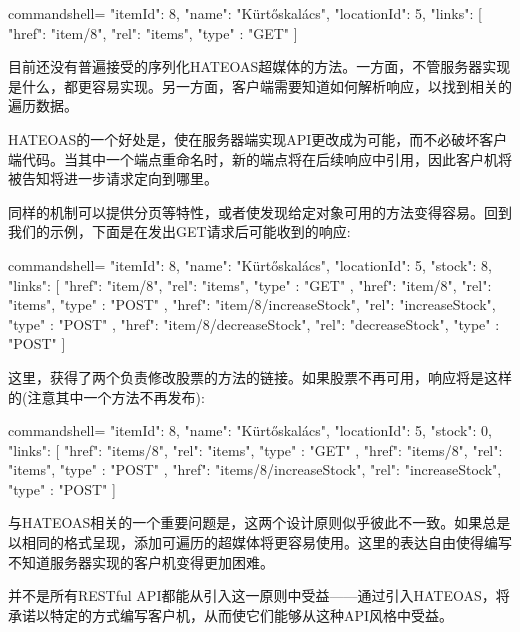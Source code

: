 \begin{tcblisting}{commandshell={}}
{
  "itemId": 8,
  "name": "Kürtőskalács",
  "locationId": 5,
  "links": [
    {
      "href": "item/8",
      "rel": "items",
      "type" : "GET"
    }
  ]
}
\end{tcblisting}

目前还没有普遍接受的序列化HATEOAS超媒体的方法。一方面，不管服务器实现是什么，都更容易实现。另一方面，客户端需要知道如何解析响应，以找到相关的遍历数据。

HATEOAS的一个好处是，使在服务器端实现API更改成为可能，而不必破坏客户端代码。当其中一个端点重命名时，新的端点将在后续响应中引用，因此客户机将被告知将进一步请求定向到哪里。

同样的机制可以提供分页等特性，或者使发现给定对象可用的方法变得容易。回到我们的示例，下面是在发出GET请求后可能收到的响应:

\begin{tcblisting}{commandshell={}}
{
  "itemId": 8,
  "name": "Kürtőskalács",
  "locationId": 5,
  "stock": 8,
  "links": [
    {
      "href": "item/8",
      "rel": "items",
      "type" : "GET"
    },
    {
      "href": "item/8",
      "rel": "items",
      "type" : "POST"
    },
    {
      "href": "item/8/increaseStock",
      "rel": "increaseStock",
      "type" : "POST"
    },
    {
      "href": "item/8/decreaseStock",
      "rel": "decreaseStock",
      "type" : "POST"
    }
  ]
}
\end{tcblisting}

这里，获得了两个负责修改股票的方法的链接。如果股票不再可用，响应将是这样的(注意其中一个方法不再发布):

\begin{tcblisting}{commandshell={}}
{
  "itemId": 8,
  "name": "Kürtőskalács",
  "locationId": 5,
  "stock": 0,
  "links": [
    {
      "href": "items/8",
      "rel": "items",
      "type" : "GET"
    },
    {
      "href": "items/8",
      "rel": "items",
      "type" : "POST"
    },
    {
      "href": "items/8/increaseStock",
      "rel": "increaseStock",
      "type" : "POST"
    }
  ]
}
\end{tcblisting}

与HATEOAS相关的一个重要问题是，这两个设计原则似乎彼此不一致。如果总是以相同的格式呈现，添加可遍历的超媒体将更容易使用。这里的表达自由使得编写不知道服务器实现的客户机变得更加困难。

并不是所有RESTful API都能从引入这一原则中受益——通过引入HATEOAS，将承诺以特定的方式编写客户机，从而使它们能够从这种API风格中受益。

